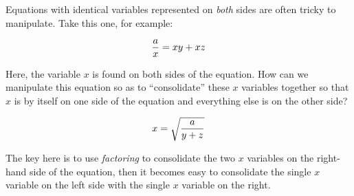 

Equations with identical variables represented on {\it both} sides are often tricky to manipulate.  Take this one, for example:

$${a \over x} = xy + xz$$

Here, the variable $x$ is found on both sides of the equation.  How can we manipulate this equation so as to ``consolidate'' these $x$ variables together so that $x$ is by itself on one side of the equation and everything else is on the other side?







$$x = \sqrt{{a \over y + z}}$$







The key here is to use {\it factoring} to consolidate the two $x$ variables on the right-hand side of the equation, then it becomes easy to consolidate the single $x$ variable on the left side with the single $x$ variable on the right.




